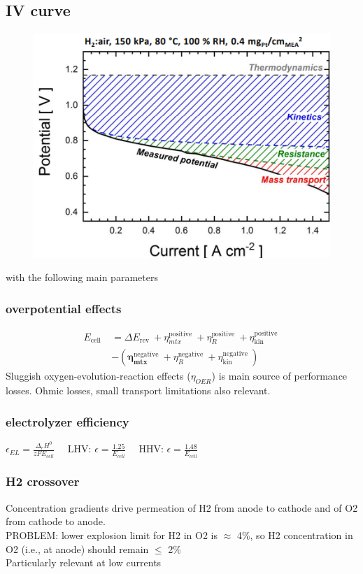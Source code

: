 \documentclass[a4paper,10pt,landscape]{scrartcl}
\begin{document}
\begin{multicols*}{3}
\subsection{IV curve}
\begin{figure}[H]
    \centering
    \includegraphics[width=1\linewidth]{src/electrolysis_iv.png}
\end{figure}
with the following main parameters
\subsubsection{overpotential effects}
$$
\begin{aligned}
E_{\text {cell }} & =\Delta E_{\text {rev }}+\eta_{mtx}^{\text {positive }}+\eta_R^{\text {positive }}+\eta_{\text {kin }}^{\text {positive }} \\
& -\left(\boldsymbol{\eta}_{\boldsymbol{m t x}}^{\text {negative }}+\eta_R^{\text {negative }}+\eta_{\text {kin }}^{\text {negative }}\right)
\end{aligned}
$$
Sluggish oxygen-evolution-reaction effects ($\eta_{OER}$) is main source of performance losses. Ohmic losses, small transport limitations also relevant.
\subsubsection{electrolyzer efficiency}
$\epsilon_{EL}=\frac{\Delta_r H^0}{zFE_{cell}}\quad$
LHV: $\epsilon=\frac{1.25}{E_{cell}}\quad$     HHV: $\epsilon=\frac{1.48}{E_{cell}}$
\subsubsection{H2 crossover}
Concentration gradients drive permeation of H2 from anode to cathode and of O2 from cathode to anode. \\
PROBLEM: lower explosion limit for H2 in O2 is $\approx$ 4\%, so H2 concentration in O2 (i.e., at anode) should remain $\leq$ 2\% \\
Particularly relevant at low currents


\end{multicols*}
\end{document}
